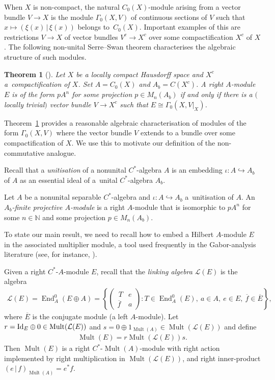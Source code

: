 \documentclass[pdftex]{sigma}
\numberwithin{equation}{section}
\newtheorem{thm}{Theorem}[section]
\DeclareMathOperator{\End}{End} %
\DeclareMathOperator{\Mult}{Mult} %
\renewcommand{\L}{\mathcal{L}}
\newcommand{\N}{\mathbb{N}} %
\newcommand{\ol}[1]{\overline{#1}} %
\begin{document}
When $X$ is non-compact, the natural $C_0(X)$-module arising from a vector bundle $V \to X$ is the module $\Gamma_0(X,V)$ of continuous sections of $V$ such that $x \mapsto (\xi(x) \,|\, \xi(x))$ belongs to~$C_0(X)$. Important examples of this are restrictions $V \to X$ of vector bundles $V^c\to X^c$ over some compactif\/ication $X^c$ of $X$. The following non-unital Serre--Swan theorem characterises the algebraic structure of such modules.

\begin{thm}[{\cite[Theorem~8]{RennieSmooth}}]
\label{thm:nonunital-SS} Let $X$ be a locally compact Hausdorff space and $X^c$ a~compacti\-fication of $X$. Set $A=C_0(X)$ and $A_b=C(X^c)$. A right $A$-module $E$ is of the form $pA^n$ for some projection $p\in M_n(A_b)$ if and only if there is a $($locally trivial$)$ vector bundle $V \to X^c$ such that $E \cong \Gamma_0(X,V|_X)$.
\end{thm}

Theorem~\ref{thm:nonunital-SS} provides a reasonable algebraic characterisation of modules of the form $\Gamma_0(X, V)$ where the vector bundle $V$ extends to a bundle over some compactif\/ication of $X$. We use this to motivate our def\/inition of the non-commutative analogue.

Recall that a \emph{unitisation} of a nonunital $C^*$-algebra $A$ is an embedding $\iota\colon A \hookrightarrow A_b$ of $A$ as an essential ideal of a~unital $C^*$-algebra $A_b$.

\begin{defn} \label{def:a-b-fgp} Let $A$ be a nonunital separable $C^*$-algebra and $\iota\colon A\hookrightarrow A_b$ a~unitisation of $A$. An \emph{$A_b$-finite projective $A$-module} is a right $A$-module that is isomorphic to $pA^n$ for some $n \in \N$ and some projection $p\in M_n(A_b)$.
\end{defn}

To state our main result, we need to recall how to embed a Hilbert $A$-module $E$ in the associated multiplier module, a tool used frequently in the Gabor-analysis literature (see, for instance, \cite{AB,RT}).

\begin{defn} \label{defn:mult-link} Given a right $C^*$-$A$-module $E$, recall that the \emph{linking algebra} $\L(E)$ is the algebra
\begin{gather*}
\L(E)=\End^0_A(E\oplus A)
=\left\{\begin{pmatrix} \,T & e\\ \ol{f} & a\end{pmatrix}\colon T\in \End_A^0(E),\ a\in A,\ e\in E,\ \ol{f}\in \ol{E}\right\},
\end{gather*}
where $\ol{E}$ is the conjugate module (a left $A$-module). Let $r={\rm Id}_E\oplus 0\in\Mult(\L(E))$ and $s=0\oplus 1_{\Mult(A)}\in \Mult(\L(E))$ and def\/ine
\begin{gather*}
\Mult(E)=r\Mult(\L(E))s.
\end{gather*}
Then $\Mult(E)$ is a right $C^*$-$\Mult(A)$-module with right action implemented by right multiplication in $\Mult(\L(E))$, and right inner-product $(e \,|\, f)_{\Mult(A)} = e^* f$.
\end{defn}
\end{document}
